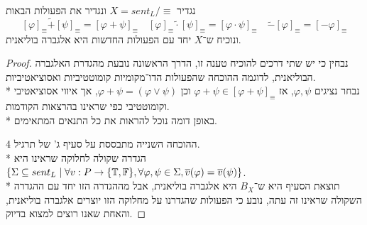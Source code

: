 \subquestion{}
נגדיר $X = sent_L / \equiv$ ונגדיר את הפעולות הבאות
\[
	{[\varphi]}_\equiv \tilde{+} {[\psi]}_\equiv = {[\varphi + \psi]}_\equiv
	\quad
	{[\varphi]}_\equiv \tilde{\cdot} {[\psi]}_\equiv = {[\varphi \cdot \psi]}_\equiv
	\quad
	\tilde{-} {[\varphi]}_\equiv = {[-\varphi]}_\equiv
\]
ונוכיח ש־$X$ יחד עם הפעולות החדשות היא אלגברה בוליאנית.
\begin{proof}
	נבחין כי יש שתי דרכים להוכיח טענה זו, הדרך הראשונה נובעת מהגדרת האלגברה הבוליאנית, לדוגמה ההוכחה שהפעולות הדו־מקומיות קומוטטיביות ואסוציאטיביות. \\*
	נבחר נציגים $\varphi, \psi$, אז $\varphi + \psi \in {[\varphi + \psi]}_\equiv$ וכן $\varphi + \psi = (\varphi \lor \psi)$, אך איווי אסוציאטיבי וקומוטטיבי כפי שראינו בהרצאות הקודמות. \\*
	באופן דומה נוכל להראות את כל התנאים המתאימים.

	ההוכחה השנייה מתבססת על סעיף ג' של תרגיל 4. \\*
	הגדרה שקולה לחלוקה שראינו היא $\{ \Sigma \subseteq sent_L \mid \forall v : P \to \{ \mathbb{T}, \mathbb{F} \}, \forall \varphi, \psi \in \Sigma, \overline{v}(\varphi) = \overline{v}(\psi)\}$. \\*
	תוצאת הסעיף היא ש־$B_X$ היא אלגברה בוליאנית, אבל מההגדרה הזו יחד עם ההגדרה השקולה שראינו זה עתה, נובע כי הפעולות שהגדרנו על מחלוקה הזו יוצרים אלגברה בוליאנית, והאחת שאנו רוצים למצוא בדיוק.
\end{proof}


